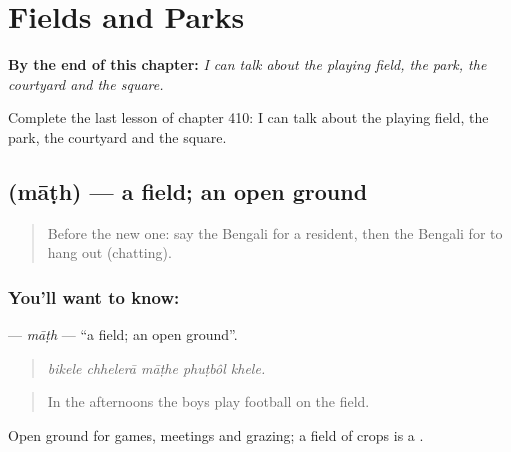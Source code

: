 
\chapter{Fields and Parks}
\label{ch:bn-fields-and-parks}

\begin{chapteropening}
\textbf{By the end of this chapter:} \emph{I can talk about the playing field, the park, the courtyard and the square.}

Complete the last lesson of chapter 410: I can talk about the playing field, the park, the courtyard and the square.
\end{chapteropening}

\section[\texorpdfstring{\bn{মাঠ} (māṭh)}{মাঠ (māṭh)}]{ (māṭh) — a field; an open ground}

\label{lesson:BN-C410-math}



\begin{quote}
Before the new one: say the Bengali for a resident, then the Bengali for to hang out (chatting).
\end{quote}

\subsection*{You'll want to know: }
\textbf{} — \emph{māṭh} — \textquotedblleft{}a field; an open ground\textquotedblright{}.

\begin{quote}
    
\end{quote}

\begin{quote}
\emph{bikele chhelerā māṭhe phuṭbôl khele.}
\end{quote}

\begin{quote}
In the afternoons the boys play football on the field.
\end{quote}

Open ground for games, meetings and grazing; a field of crops is a .

